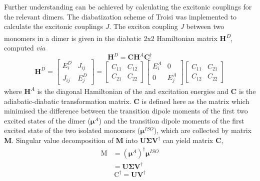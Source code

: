Further understanding can be achieved by calculating the excitonic couplings for the relevant dimers. The diabatization scheme of Troisi was implemented to calculate the excitonic couplings $J$.\cite{Arago2015} The exciton coupling \textit{J} between two monomers in a dimer is given in the diabatic 2x2 Hamiltonian matrix \textbf{H}\textsuperscript{\textit{D}}, computed \textit{via}
\begin{equation}
\textbf{H}^{D}=\textbf{C}\textbf{H}^{A}\textbf{C}^\dag
\label{equation: diabatic hamiltonian}
\end{equation}
\begin{equation}
\label{equation: diabatic matrix}
\textbf{H}^D=
\begin{bmatrix}
E_{i}^D & J_{ij}\\
J_{ij} & E_{j}^D
\end{bmatrix}
=
\begin{bmatrix}
C_{11} & C_{12}\\
C_{21} & C_{22}
\end{bmatrix}
\begin{bmatrix}
E_{i}^A & 0\\
0 & E_{j}^A
\end{bmatrix}
\begin{bmatrix}
C_{11} & C_{21}\\
C_{12} & C_{22}
\end{bmatrix}
\end{equation} 
where \textbf{H}\textsuperscript{\textit{A}} is the diagonal Hamiltonian of the \sone{} and \stwo{} excitation energies and \textbf{C} is the adiabatic-diabatic transformation matrix. \textbf{C} is defined here as the matrix which minimised the difference between the transition dipole moments of the first two excited states of the dimer ($\bm{\mu}^{A}$) and the transition dipole moments of the first excited state of the two isolated monomers ($\bm{\mu}^{ISO}$), which are collected by matrix \textbf{M}. Singular value decomposition of \textbf{M} into $\bm{U\Sigma{}V}^{\dag}$ can yield matrix \textbf{C},
\begin{equation}
\begin{split}
    \bm{\mathrm{M}}&=(\bm{\mu}^{A})^{\dag}\bm{\mu}^{ISO}\\
    &=\bm{U\Sigma{}V}^{\dag}
    \end{split}
\end{equation}
\begin{equation}
    \bm{\mathrm{C}}^{\dag}=\bm{UV}^{\dag}
\end{equation}

